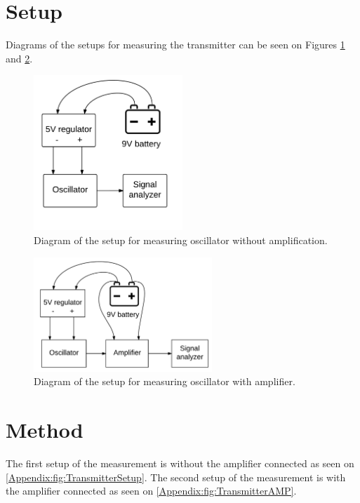 \section*{Setup}
Diagrams of the setups for measuring the transmitter can be seen on Figures \ref{Appendix:fig:TransmitterSetup} and \ref{Appendix:fig:TransmitterAMP}.
\begin{figure} [!h]
    \centering
        \includegraphics[width=0.5\textwidth]{figures/test/TransmitterOSC}
        \caption{Diagram of the setup for measuring oscillator without amplification.}
        \label{Appendix:fig:TransmitterSetup}
\end{figure}
\begin{figure} [!h]
    \centering
        \includegraphics[width=0.6\textwidth]{figures/test/TransmitterAMP}
        \caption{Diagram of the setup for measuring oscillator with amplifier.}
        \label{Appendix:fig:TransmitterAMP}
\end{figure}

\section*{Method}
The first setup of the measurement is without the amplifier connected as seen on \autoref{Appendix:fig:TransmitterSetup}.
The second setup of the measurement is with the amplifier connected as seen on \autoref{Appendix:fig:TransmitterAMP}.

